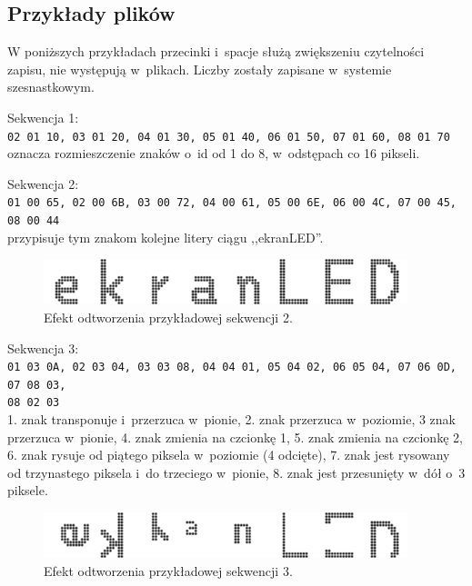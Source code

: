 \subsection{Przykłady plików}
W poniższych przykładach przecinki i~spacje służą zwiększeniu czytelności zapisu, nie występują w~plikach. Liczby zostały zapisane w~systemie szesnastkowym.

Sekwencja 1:\\
{\small\texttt{02 01 10, 03 01 20, 04 01 30, 05 01 40, 06 01 50, 07 01 60, 08 01 70}}\\
oznacza rozmieszczenie znaków o~id od 1 do 8, w~odstępach co 16 pikseli.

Sekwencja 2:\\
{\small\texttt{01 00 65, 02 00 6B, 03 00 72, 04 00 61, 05 00 6E, 06 00 4C, 07 00 45, 08 00 44}}\\
przypisuje tym znakom kolejne litery ciągu ,,ekranLED''.
\begin{figure}[htb]
	\begin{center}
		\includegraphics[width=300pt]{figures/screensample1.png}
	\end{center}
	\caption{Efekt odtworzenia przykładowej sekwencji 2.}
\end{figure}

Sekwencja 3:\\
{\small\texttt{01 03 0A, 02 03 04, 03 03 08, 04 04 01, 05 04 02, 06 05 04, 07 06 0D, 07 08 03,\\08 02 03}}\\
1. znak transponuje i~przerzuca w~pionie, 2. znak przerzuca w~poziomie, 3 znak przerzuca w~pionie, 4. znak zmienia na czcionkę 1, 5. znak zmienia na czcionkę 2, 6. znak rysuje od piątego piksela w~poziomie (4 odcięte), 7. znak jest rysowany od trzynastego piksela i~do trzeciego w~pionie, 8. znak jest przesunięty w~dół o~3 piksele.

\begin{figure}[htb]
	\begin{center}
		\includegraphics[width=300pt]{figures/screensample2.png}
	\end{center}
	\caption{Efekt odtworzenia przykładowej sekwencji 3.}
\end{figure}


